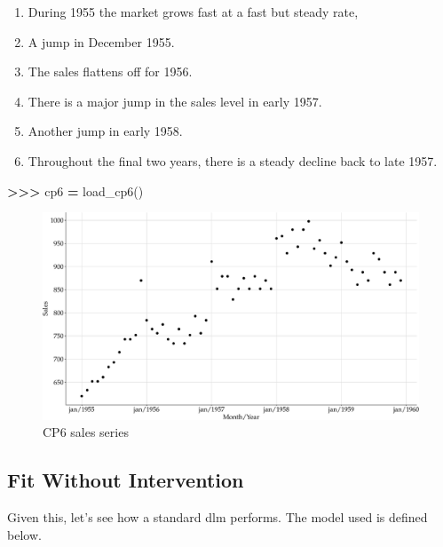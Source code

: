 \documentclass[
]{article}
\newenvironment{Shaded}{\begin{snugshade}}{\end{snugshade}}
\newcommand{\NormalTok}[1]{#1}
\newcommand{\OperatorTok}[1]{\textcolor[rgb]{0.81,0.36,0.00}{\textbf{#1}}}
\providecommand{\tightlist}{%
  \setlength{\itemsep}{0pt}\setlength{\parskip}{0pt}}
\begin{document}
\begin{enumerate}
\def\labelenumi{\arabic{enumi}.}
\tightlist
\item
  During 1955 the market grows fast at a fast but steady rate,
\item
  A jump in December 1955.
\item
  The sales flattens off for 1956.
\item
  There is a major jump in the sales level in early 1957.
\item
  Another jump in early 1958.
\item
  Throughout the final two years, there is a steady decline back to late
  1957.
\end{enumerate}

\begin{Shaded}
\begin{Highlighting}[]
\OperatorTok{\textgreater{}\textgreater{}\textgreater{}}\NormalTok{ cp6 }\OperatorTok{=}\NormalTok{ load\_cp6()}
\end{Highlighting}
\end{Shaded}

\begin{figure}

{\centering \includegraphics[width=0.9\linewidth]{pybats_detection_files/figure-latex/plot-cp6-1} 

}

\caption{CP6 sales series}\label{fig:plot-cp6}
\end{figure}

\hypertarget{fit-without-intervention}{%
\subsection{Fit Without Intervention}\label{fit-without-intervention}}

Given this, let's see how a standard dlm performs. The model used is
defined below.
\end{document}
